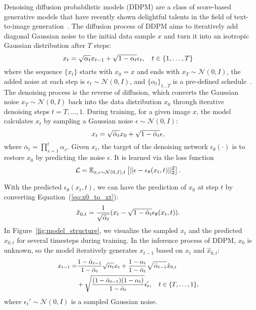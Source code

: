 \documentclass[10pt,twocolumn,letterpaper]{article}
\begin{document}
Denoising diffusion probabilistic models (DDPM) are a class of score-based generative models that have recently shown delightful talents in the field of text-to-image generation~\cite{DBLP:conf/nips/HoJA20}.
The diffusion process of DDPM aims to iteratively add diagonal Gaussian noise to the initial data sample $x$ and turn it into an isotropic Gaussian distribution after $T$ steps:
\begin{equation}
\small
    x_t = \sqrt{\alpha_t} x_{t-1} + \sqrt{1-\alpha_t} \epsilon_t, \quad t \in \{1,\dots,T\}
\end{equation}
where the sequence $\{x_t\}$ starts with $x_0 = x$ and ends with $x_T \sim \mathcal{N}(0,I)$, the added noise at each step is $\epsilon_t \sim \mathcal{N}(0,I)$, and $\{\alpha_t\}_{1 \dots T}$ is a pre-defined schedule~\cite{DBLP:conf/icml/Sohl-DicksteinW15,DBLP:conf/iclr/0011SKKEP21}.
The denoising process is the reverse of diffusion, which converts the Gaussian noise $x_T \sim \mathcal{N}(0,I)$ back into the data distribution $x_0$ through iterative denoising steps $t = T,\dots, 1$. 
During training, for a given image $x$, the model calculates $x_t$ by sampling a Gaussian noise $\epsilon \sim \mathcal{N}(0,I)$:
\begin{equation}
\label{eq:x0_to_xt}
\small
    x_t = \sqrt{\bar{\alpha}_t} x_0 + \sqrt{1-\bar{\alpha}_t} \epsilon,
\end{equation}
where $\bar{\alpha}_t = \prod_{s=1}^t\alpha_s$. Given $x_t$, the target of the denoising network $\epsilon_\theta(\cdot)$ is to restore $x_0$ by predicting the noise $\epsilon$. It is learned via the loss function
\begin{equation}
\label{eq:loss}
\small
    \mathcal{L} = \mathbb{E}_{x, \epsilon \sim \mathcal{N}(0,I), t} 
    \left[ || \epsilon - \epsilon_\theta(x_t, t) ||_2^2 \right].
\end{equation}

With the predicted $\epsilon_\theta(x_t, t)$, we can have the prediction of $x_0$ at step $t$ by converting Equation~(\ref{eq:x0_to_xt}):
\begin{equation}
\small
    \hat{x}_{0,t} = \frac{1}{\sqrt{\bar{\alpha}_t}}(x_t - \sqrt{1-\bar{\alpha}_t} \epsilon_\theta(x_t, t)).
\end{equation}
In Figure~\ref{fig:model_structure}, we visualize the sampled $x_t$ and the predicted $\hat{x}_{0,t}$ for several timesteps during training.
In the inference process of DDPM, $x_0$ is unknown, so the model iteratively generates $x_{t-1}$ based on $x_t$ and $\hat{x}_{0,t}$:
\begin{equation}
\small
\begin{aligned}
    x_{t-1} = &\frac{ 1 - \bar{\alpha}_{t-1}}{1 - \bar{\alpha}_t} \sqrt{\alpha_t} x_t + 
    \frac{1 - \alpha_t }{1 - \bar{\alpha}_t} \sqrt{\bar{\alpha}_{t-1}} \hat{x}_{0,t} \\
    &+ \sqrt{\frac{(1 - \bar{\alpha}_{t-1})(1-\alpha_t)}{1 - \bar{\alpha}_t}} \epsilon_t', 
    \quad  t \in \{T, \dots, 1\},
\end{aligned}
\end{equation}
where $\epsilon_t' \sim \mathcal{N}(0,I)$ is a sampled Gaussian noise.
\end{document}
